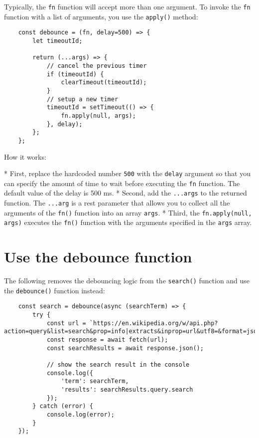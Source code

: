\documentclass[11pt]{article}
\begin{document}
\noindent
Typically, the \verb|fn| function will accept more than one argument.
To invoke the \verb|fn| function with a list of arguments,
you use the \verb|apply()| method:

\begin{lstlisting}
    const debounce = (fn, delay=500) => {
        let timeoutId;

        return (...args) => {
            // cancel the previous timer
            if (timeoutId) {
                clearTimeout(timeoutId);
            }
            // setup a new timer
            timeoutId = setTimeout(() => {
                fn.apply(null, args);
            }, delay);
        };
    };
\end{lstlisting}

\noindent
How it works:

* First, replace the hardcoded number \verb|500| with the \verb|delay| argument so
that you can specify the amount of time to wait before executing the \verb|fn|
function. The default value of the delay is 500 ms.
* Second, add the \verb|...args| to the returned function. The \verb|...arg|
is a rest parameter that allows you to collect all the arguments
of the \verb|fn()| function into an array \verb|args|.
* Third, the \verb|fn.apply(null, args)| executes the \verb|fn()| function with
the arguments specified in the \verb|args| array.

\section*{Use the debounce function}

The following removes the debouncing logic from the \verb|search()| function
and use the \verb|debounce()| function instead:

\begin{lstlisting}
    const search = debounce(async (searchTerm) => {
        try {
            const url = `https://en.wikipedia.org/w/api.php?action=query&list=search&prop=info|extracts&inprop=url&utf8=&format=json&origin=*&srlimit=10&srsearch=${searchTerm}`;
            const response = await fetch(url);
            const searchResults = await response.json();

            // show the search result in the console
            console.log({
                'term': searchTerm,
                'results': searchResults.query.search
            });
        } catch (error) {
            console.log(error);
        }
    });
\end{lstlisting}
\end{document}
